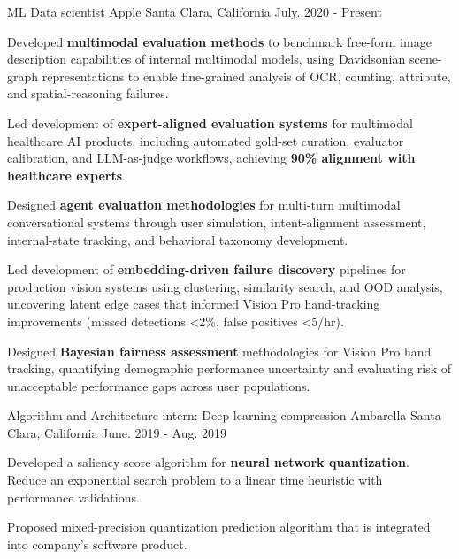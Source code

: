 
\begin{cventries}
    \cventry
    {ML Data scientist}
    {Apple}
    {Santa Clara, California}
    {July. 2020 - Present}
    {
      \begin{cvitems}
\item{Developed \textbf{multimodal evaluation methods} to benchmark free-form image description capabilities of internal multimodal models, using Davidsonian scene-graph representations to enable fine-grained analysis of OCR, counting, attribute, and spatial-reasoning failures.}
\item{Led development of \textbf{expert-aligned evaluation systems} for multimodal healthcare AI products, including automated gold-set curation, evaluator calibration, and LLM-as-judge workflows, achieving \textbf{90\% alignment with healthcare experts}.}
\item{Designed \textbf{agent evaluation methodologies} for multi-turn multimodal conversational systems through user simulation, intent-alignment assessment, internal-state tracking, and behavioral taxonomy development.}
\item{Led development of \textbf{embedding-driven failure discovery} pipelines for production vision systems using clustering, similarity search, and OOD analysis, uncovering latent edge cases that informed Vision Pro hand-tracking improvements (missed detections <2\%, false positives <5/hr).}
\item{Designed \textbf{Bayesian fairness assessment} methodologies for Vision Pro hand tracking, quantifying demographic performance uncertainty and evaluating risk of unacceptable performance gaps across user populations.}
\end{cvitems}}
    
    \cventry
    {Algorithm and Architecture intern: Deep learning compression}
    {Ambarella}
    {Santa Clara, California}
    {June. 2019 - Aug. 2019}
    {
      \begin{cvitems}
        \item{Developed a saliency score algorithm for \textbf{neural network quantization}. Reduce an exponential search problem to a linear time heuristic  with performance validations.
        }
        \item{Proposed mixed-precision quantization prediction algorithm that is integrated into company's software product.}
      \end{cvitems}
    }
\end{cventries}
